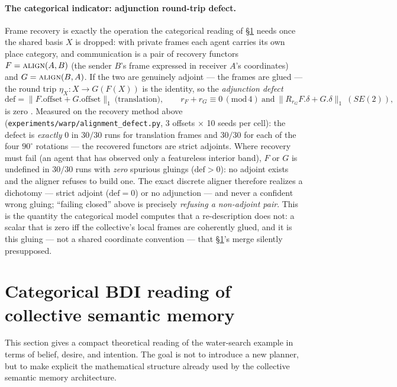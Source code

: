 \documentclass{article}
\begin{document}
\paragraph{The categorical indicator: adjunction round-trip defect.}
Frame recovery is exactly the operation the categorical reading of
\S\ref{p4:sec:categorical} needs once the shared basis $X$ is dropped: with
private frames each agent carries its own place category, and
communication is a pair of recovery functors $F=\textsc{align}(A,B)$
(the sender $B$'s frame expressed in receiver $A$'s coordinates) and
$G=\textsc{align}(B,A)$. If the two are genuinely adjoint --- the frames
are glued --- the round trip $\eta_X: X\to G(F(X))$ is the identity, so
the \emph{adjunction defect}
\[
\mathrm{def}=\lVert F.\mathrm{offset}+G.\mathrm{offset}\rVert_1
\ \text{(translation)},\qquad
r_F{+}r_G\equiv 0\,(\mathrm{mod}\,4)\ \text{and}\
\lVert R_{r_G}F.\delta+G.\delta\rVert_1\ (SE(2)),
\]
is zero \citep{maclane1998categories}. Measured on the recovery method
above (\texttt{experiments/warp/alignment\_defect.py}, 3 offsets
$\times$ 10 seeds per cell): the defect is \emph{exactly} $0$ in $30/30$
runs for translation frames and $30/30$ for each of the four $90^\circ$
rotations --- the recovered functors are strict adjoints. Where recovery
must fail (an agent that has observed only a featureless interior band),
$F$ or $G$ is undefined in $30/30$ runs with \emph{zero} spurious
gluings ($\mathrm{def}>0$): no adjoint exists and the aligner refuses to
build one. The exact discrete aligner therefore realizes a dichotomy ---
strict adjoint ($\mathrm{def}{=}0$) or no adjunction --- and never a
confident wrong gluing; ``failing closed'' above is precisely
\emph{refusing a non-adjoint pair}. This is the quantity the categorical
model computes that a re-description does not: a scalar that is zero iff
the collective's local frames are coherently glued, and it is this
gluing --- not a shared coordinate convention --- that
\S\ref{p4:sec:categorical}'s merge silently presupposed.

\section{Categorical BDI reading of collective semantic memory}
\label{p4:sec:categorical}

This section gives a compact theoretical reading of the water-search
example in terms of belief, desire, and intention. The goal is not to
introduce a new planner, but to make explicit the mathematical
structure already used by the collective semantic memory architecture.
\end{document}
